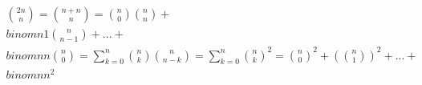 \documentclass[preview]{standalone}
\begin{document}
\begin{align*}
\binom{2n}{n} = \binom{n+n}{n} = \binom{n}{0}\binom{n}{n} + \\binom{n}{1}\binom{n}{n-1} + ... + \\binom{n}{n}\binom{n}{0} = \sum_{k=0}^{n}\binom{n}{k}\binom{n}{n-k} = \sum_{k=0}^{n}\binom{n}{k}^2 = \binom{n}{0}^2 + (\binom{n}{1})^2 + ... + \\binom{n}{n}^2
\end{align*}
\end{document}

